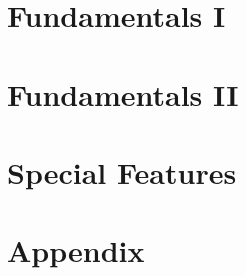 \documentclass[wordperfect]{initech-manual}
\begin{document}
\FrontMatterFolios
\MakeTitlePage

\tableofcontents

\cleardoublepage
\setcounter{page}{1}\gdef{}
\DividerLeaf
\chapter{Fundamentals I}








\DividerLeaf
\chapter{Fundamentals II}








\DividerLeaf
\chapter{Special Features}























\DividerLeaf
\chapter{Appendix}

\printindex
\FinishBook
\end{document}
